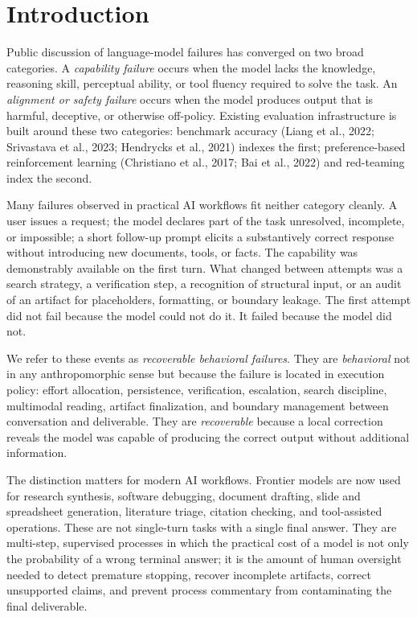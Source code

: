 \documentclass[11pt]{article}
\begin{document}
\tableofcontents
\newpage


\section{Introduction}

Public discussion of language-model failures has converged on two broad categories. A \emph{capability failure} occurs when the model lacks the knowledge, reasoning skill, perceptual ability, or tool fluency required to solve the task. An \emph{alignment or safety failure} occurs when the model produces output that is harmful, deceptive, or otherwise off-policy. Existing evaluation infrastructure is built around these two categories: benchmark accuracy (Liang et al., 2022; Srivastava et al., 2023; Hendrycks et al., 2021) indexes the first; preference-based reinforcement learning (Christiano et al., 2017; Bai et al., 2022) and red-teaming index the second.

Many failures observed in practical AI workflows fit neither category cleanly. A user issues a request; the model declares part of the task unresolved, incomplete, or impossible; a short follow-up prompt elicits a substantively correct response without introducing new documents, tools, or facts. The capability was demonstrably available on the first turn. What changed between attempts was a search strategy, a verification step, a recognition of structural input, or an audit of an artifact for placeholders, formatting, or boundary leakage. The first attempt did not fail because the model could not do it. It failed because the model did not.

We refer to these events as \emph{recoverable behavioral failures}. They are \emph{behavioral} not in any anthropomorphic sense but because the failure is located in execution policy: effort allocation, persistence, verification, escalation, search discipline, multimodal reading, artifact finalization, and boundary management between conversation and deliverable. They are \emph{recoverable} because a local correction reveals the model was capable of producing the correct output without additional information.

The distinction matters for modern AI workflows. Frontier models are now used for research synthesis, software debugging, document drafting, slide and spreadsheet generation, literature triage, citation checking, and tool-assisted operations. These are not single-turn tasks with a single final answer. They are multi-step, supervised processes in which the practical cost of a model is not only the probability of a wrong terminal answer; it is the amount of human oversight needed to detect premature stopping, recover incomplete artifacts, correct unsupported claims, and prevent process commentary from contaminating the final deliverable.
\end{document}

